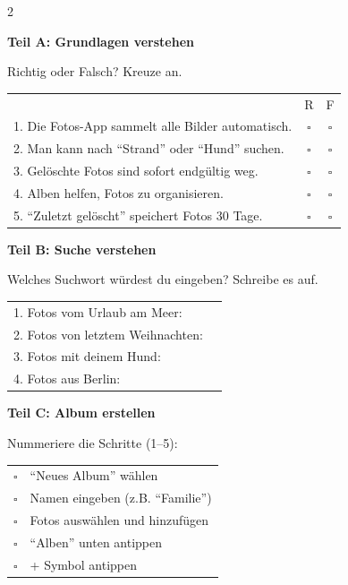 \documentclass[a4paper,landscape,8pt]{extarticle}
\begin{document}
\begin{multicols}{2}

\textbf{\large Teil A: Grundlagen verstehen}

Richtig oder Falsch? Kreuze an.

\vspace{2mm}

\renewcommand{\arraystretch}{1.6}
\begin{tabular}{@{}p{8cm}cc@{}}
& R & F \\
1. Die Fotos-App sammelt alle Bilder automatisch. & $\square$ & $\square$ \\
2. Man kann nach ``Strand'' oder ``Hund'' suchen. & $\square$ & $\square$ \\
3. Gelöschte Fotos sind sofort endgültig weg. & $\square$ & $\square$ \\
4. Alben helfen, Fotos zu organisieren. & $\square$ & $\square$ \\
5. ``Zuletzt gelöscht'' speichert Fotos 30 Tage. & $\square$ & $\square$ \\
\end{tabular}
\renewcommand{\arraystretch}{1}

\vspace{6mm}

\textbf{\large Teil B: Suche verstehen}

Welches Suchwort würdest du eingeben? Schreibe es auf.

\vspace{2mm}

\renewcommand{\arraystretch}{1.8}
\begin{tabular}{@{}p{6cm}p{5cm}@{}}
1. Fotos vom Urlaub am Meer: & \dotfill \\
2. Fotos von letztem Weihnachten: & \dotfill \\
3. Fotos mit deinem Hund: & \dotfill \\
4. Fotos aus Berlin: & \dotfill \\
\end{tabular}
\renewcommand{\arraystretch}{1}

\vspace{6mm}

\textbf{\large Teil C: Album erstellen}

Nummeriere die Schritte (1--5):

\vspace{2mm}

\renewcommand{\arraystretch}{1.8}
\begin{tabular}{@{}cp{7cm}@{}}
$\square$ & ``Neues Album'' wählen \\
$\square$ & Namen eingeben (z.B. ``Familie'') \\
$\square$ & Fotos auswählen und hinzufügen \\
$\square$ & ``Alben'' unten antippen \\
$\square$ & + Symbol antippen \\
\end{tabular}
\renewcommand{\arraystretch}{1}


\end{multicols}
\end{document}
